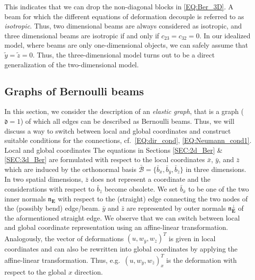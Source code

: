 \documentclass[a4paper, english, 12pt, reqno, draft]{amsart}
\makeatletter
\theoremstyle{definition}
\theoremstyle{remark}
\numberwithin{equation}{section}
\newcommand{\Edge}{{\ensuremath{\boldsymbol E}}}
\newcommand{\locDim}{\ensuremath{\mathfrak d}}
\newcommand{\Normal}{\ensuremath{\mathfrak n_\Edge}}
\newcommand{\NormalOuter}{\ensuremath{\mathfrak n^\perp_\Edge}}
\def\paragraph{\@startsection{paragraph}{4}%
  \z@\z@{-\fontdimen2\font}%
  {\normalfont\scshape}}
\makeatother
\begin{document}
% 
This indicates that we can drop the non-diagonal blocks in \eqref{EQ:Ber_3D}. A beam for which the different equations of deformation decouple is referred to as \emph{isotropic}. Thus, two dimensional beams are always considered as isotropic, and three dimensional beams are isotropic if and only if $c_{23} = c_{32} = 0$. In our idealized model, where beams are only one-dimensional objects, we can safely assume that $\tilde y = \tilde z = 0$. Thus, the three-dimensional model turns out to be a direct generalization of the two-dimensional model.
% 
\subsection{Graphs of Bernoulli beams}
% 
In this section, we consider the description of an \emph{elastic graph}, that is a graph ($\locDim = 1$) of which all edges can be described as Bernoulli beams. Thus, we will discuss a way to switch between local and global coordinates and construct suitable conditions for the connections, cf.~\eqref{EQ:dir_cond}, \eqref{EQ:Neumann_cond1}.
% 
\paragraph{Local and global coordinates}
% 
The equations in Sections \ref{SEC:2d_Ber} \& \ref{SEC:3d_Ber} are formulated with respect to the local coordinates $\bar x$, $\bar y$, and $\bar z$ which are induced by the orthonormal basis $\bar{\mathcal B} = \{ \bar b_{\bar x}, \bar b_{\bar y}, \bar b_{\bar z}\}$ in three dimensions. In two spatial dimensions, $\bar z$ does not represent a coordinate and the considerations with respect to $\bar b_{\bar z}$ become obsolete. We set 
$\bar b_{\bar x}$ to be one of the two inner normals $\Normal$ with respect to the (straight) edge connecting the two nodes of the (possibly bend) edge/beam. $\bar y$ and $\bar z$ are represented by outer normals $\NormalOuter$ of the aformentioned straight edge. We observe that we can switch between local and global coordinate representation using an affine-linear transformation. Analogously, the vector of deformations $(u, w_{\bar y}, w_{\bar z})^T$ is given in local coordinates and can also be rewritten into global coordinates by applying the affine-linear transformation. Thus, e.g.~$(u, w_{\bar y}, w_{\bar z})^T_x$ is the deformation with respect to the global $x$ direction.
% 
\end{document}
